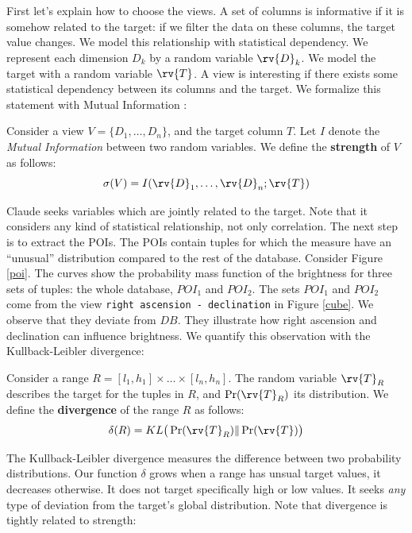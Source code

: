 First let's explain how to choose the views. A set of columns is informative if
it is somehow related to the target: if we filter the data on these columns, the target
value changes.  We model this relationship with statistical dependency. We
represent each  dimension $D_k$ by a random variable $\rv{D}_k$. We model the
target with a random variable $\rv{T}$.  A view is interesting if there exists
some statistical dependency between its columns and the target. We formalize
this statement with Mutual Information \cite{cover2012elements}:

\begin{definition}
Consider a view $V = \{D_1, \ldots, D_n\}$, and the target column $T$.  Let
$I$ denote the \emph{Mutual Information} between two random variables. We
define the \textbf{strength} of $V$ as follows:
\[\sigma(V) = I(\rv{D}_1, \ldots, \rv{D}_n ; \rv{T})\]
\end{definition}

Claude seeks variables which are jointly related to the target. Note that it
considers any kind of statistical relationship, not only correlation.
The next step is to extract the POIs. The POIs contain tuples for which the
measure have an ``unusual'' distribution compared to the rest of the database.
Consider Figure \ref{poi}. The curves show the probability mass function of the
brightness for three sets of tuples: the whole database, $POI_1$ and $POI_2$.
The sets $POI_1$ and $POI_2$ come from the view \texttt{right ascension -
declination} in Figure \ref{cube}. We observe that they deviate from $DB$.
They illustrate how right ascension and declination can influence
brightness. We quantify this observation with the Kullback-Leibler
divergence:

\begin{definition}
Consider a range $R = [l_1, h_1] \times \ldots \times [l_n, h_n]$. 
The random variable $\rv{T}_R$ describes the target for
the tuples in $R$, and $\Pr(\rv{T}_R)$ its distribution.
We define the \textbf{divergence} of the range $R$ as follows: 
\[\delta(R) = KL \big( \Pr(\rv{T}_R) \| \Pr(\rv{T})  \big)\]
\end{definition}

The Kullback-Leibler divergence measures the difference between two probability
distributions. Our function $\delta$ grows when a range has unsual target
values, it decreases otherwise. It does not target specifically high or low
values. It seeks \emph{any} type of deviation from the target's global distribution.
Note that divergence is tightly related to strength:

